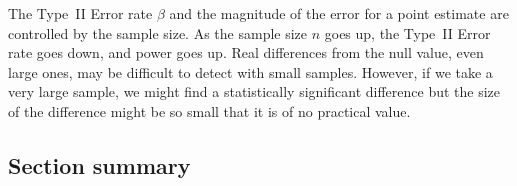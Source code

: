 The Type~II Error rate $\beta$ and the magnitude of the error for a point estimate are controlled by the sample size. As the sample size $n$ goes up, the Type~II Error rate goes down, and power goes up. Real differences from the null value, even large ones, may be difficult to detect with small samples. However, if we take a very large sample, we might find a statistically significant difference but the size of the difference might be so small that it is of no practical value.



\D{\newpage}

\subsection*{Section summary}



